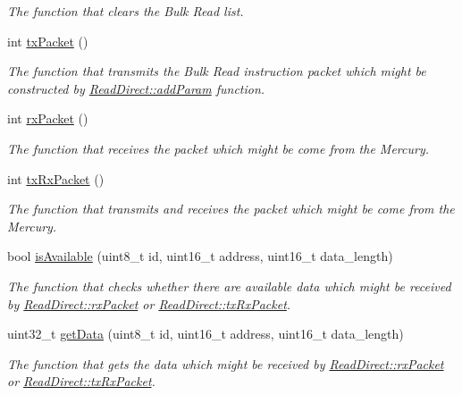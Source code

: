 \begin{DoxyCompactItemize}
\begin{DoxyCompactList}\small\item\em The function that clears the Bulk Read list. \end{DoxyCompactList}\item 
int \hyperlink{classmercury_1_1_read_direct_a2a0d35bd9736a001ad2deeab43794cd6}{tx\+Packet} ()
\begin{DoxyCompactList}\small\item\em The function that transmits the Bulk Read instruction packet which might be constructed by \hyperlink{classmercury_1_1_read_direct_ad0c586d8d610414f9dea589b181ea48a}{Read\+Direct\+::add\+Param} function. \end{DoxyCompactList}\item 
int \hyperlink{classmercury_1_1_read_direct_acb378e4cb210f59a75b7e20b3462724a}{rx\+Packet} ()
\begin{DoxyCompactList}\small\item\em The function that receives the packet which might be come from the Mercury. \end{DoxyCompactList}\item 
int \hyperlink{classmercury_1_1_read_direct_a04798e967278faf61a842ee753d1cf30}{tx\+Rx\+Packet} ()
\begin{DoxyCompactList}\small\item\em The function that transmits and receives the packet which might be come from the Mercury. \end{DoxyCompactList}\item 
bool \hyperlink{classmercury_1_1_read_direct_a2d89253019859e37d72fda82cd9c7117}{is\+Available} (uint8\+\_\+t id, uint16\+\_\+t address, uint16\+\_\+t data\+\_\+length)
\begin{DoxyCompactList}\small\item\em The function that checks whether there are available data which might be received by \hyperlink{classmercury_1_1_read_direct_acb378e4cb210f59a75b7e20b3462724a}{Read\+Direct\+::rx\+Packet} or \hyperlink{classmercury_1_1_read_direct_a04798e967278faf61a842ee753d1cf30}{Read\+Direct\+::tx\+Rx\+Packet}. \end{DoxyCompactList}\item 
uint32\+\_\+t \hyperlink{classmercury_1_1_read_direct_ae952ad7a5578cae43264635d1cb131dc}{get\+Data} (uint8\+\_\+t id, uint16\+\_\+t address, uint16\+\_\+t data\+\_\+length)
\begin{DoxyCompactList}\small\item\em The function that gets the data which might be received by \hyperlink{classmercury_1_1_read_direct_acb378e4cb210f59a75b7e20b3462724a}{Read\+Direct\+::rx\+Packet} or \hyperlink{classmercury_1_1_read_direct_a04798e967278faf61a842ee753d1cf30}{Read\+Direct\+::tx\+Rx\+Packet}. \end{DoxyCompactList}\end{DoxyCompactItemize}


